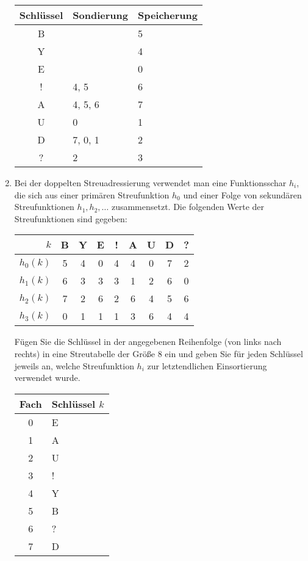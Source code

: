 \documentclass{lehramt-informatik-aufgabe}
\begin{document}
\begin{enumerate}
\begin{liAntwort}
\begin{center}
\begin{tabular}{|c||l|l|}
\hline
Schlüssel & Sondierung & Speicherung\\
\hline
B & & 5 \\
Y & & 4 \\
E & & 0 \\
! & 4, 5 & 6 \\
A & 4, 5, 6 & 7 \\
U & 0 & 1 \\
D & 7, 0, 1 & 2 \\
? & 2 & 3 \\
\hline
\end{tabular}
\end{center}
\end{liAntwort}


\item Bei der doppelten Streuadressierung verwendet man eine
Funktionsschar $h_i$, die sich aus einer primären Streufunktion $h_0$
und einer Folge von sekundären Streufunktionen $h_1, h_2,\dots$
zusammensetzt. Die folgenden Werte der Streufunktionen sind gegeben:

\begin{center}
\begin{tabular}{|r||c|c|c|c|c|c|c|c|}
\hline
$k$      & B & Y & E & ! & A & U & D & ? \\\hline
$h_0(k)$ & 5 & 4 & 0 & 4 & 4 & 0 & 7 & 2 \\\hline
$h_1(k)$ & 6 & 3 & 3 & 3 & 1 & 2 & 6 & 0 \\\hline
$h_2(k)$ & 7 & 2 & 6 & 2 & 6 & 4 & 5 & 6 \\\hline
$h_3(k)$ & 0 & 1 & 1 & 1 & 3 & 6 & 4 & 4 \\\hline
\end{tabular}
\end{center}

Fügen Sie die Schlüssel in der angegebenen Reihenfolge (von links nach
rechts) in eine Streutabelle der Größe $8$ ein und geben Sie für jeden
Schlüssel jeweils an, welche Streufunktion $h_i$ zur letztendlichen
Einsortierung verwendet wurde.

\begin{liAntwort}
\begin{center}
\begin{tabular}{|c||l|}
\hline
Fach & Schlüssel $k$\\
\hline
0 & E \\
1 & A \\
2 & U \\
3 & ! \\
4 & Y \\
5 & B \\
6 & ? \\
7 & D \\
\hline
\end{tabular}
\end{center}


\end{liAntwort}
\end{enumerate}
\end{document}
